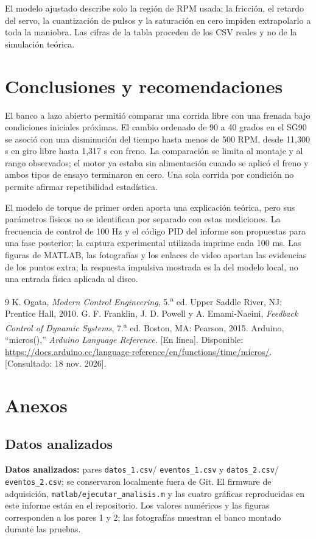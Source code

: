 \documentclass[9pt,a4paper,twocolumn]{extarticle}
\begin{document}
El modelo ajustado describe solo la región de RPM usada; la fricción,
el retardo del servo, la cuantización de pulsos y la saturación en
cero impiden extrapolarlo a toda la maniobra. Las cifras de la tabla
proceden de los CSV reales y no de la simulación teórica.

\section{Conclusiones y recomendaciones}

El banco a lazo abierto permitió comparar una corrida libre con una
frenada bajo condiciones iniciales próximas. El cambio ordenado de
90 a 40 grados en el SG90 se asoció con una disminución del tiempo
hasta menos de 500 RPM, desde 11,300 s en giro libre hasta 1,317 s
con freno. La comparación se limita al montaje y al rango
observados; el motor ya estaba sin alimentación cuando se aplicó
el freno y ambos tipos de ensayo terminaron en cero. Una sola
corrida por condición no permite afirmar repetibilidad estadística.

El modelo de torque de primer orden aporta una explicación teórica,
pero sus parámetros físicos no se identifican por separado con
estas mediciones. La frecuencia de control de 100 Hz y el código
PID del informe son propuestas para una fase posterior; la
captura experimental utilizada imprime cada 100 ms. Las figuras de
MATLAB, las fotografías y los enlaces de video aportan las
evidencias de los puntos extra; la respuesta impulsiva mostrada
es la del modelo local, no una entrada física aplicada al disco.

\begin{thebibliography}{9}
 K. Ogata, \emph{Modern Control Engineering}, 5.\textsuperscript{a} ed. Upper Saddle River, NJ: Prentice Hall, 2010.
 G. F. Franklin, J. D. Powell y A. Emami-Naeini, \emph{Feedback Control of Dynamic Systems}, 7.\textsuperscript{a} ed. Boston, MA: Pearson, 2015.
 Arduino, ``micros(),'' \emph{Arduino Language Reference}. [En línea]. Disponible: \url{https://docs.arduino.cc/language-reference/en/functions/time/micros/}. [Consultado: 18 nov. 2026].
\end{thebibliography}

\onecolumn
\section{Anexos}
\subsection{Datos analizados}
\textbf{Datos analizados:} pares \texttt{datos\_1.csv}/
\texttt{eventos\_1.csv} y \texttt{datos\_2.csv}/
\texttt{eventos\_2.csv}; se conservaron localmente fuera de Git.
El firmware de adquisición, \texttt{matlab/ejecutar\_analisis.m}
y las cuatro gráficas reproducidas en este informe están en el
repositorio.
Los valores numéricos y las figuras corresponden a los pares 1 y 2;
las fotografías muestran el banco montado durante las pruebas.
\end{document}

